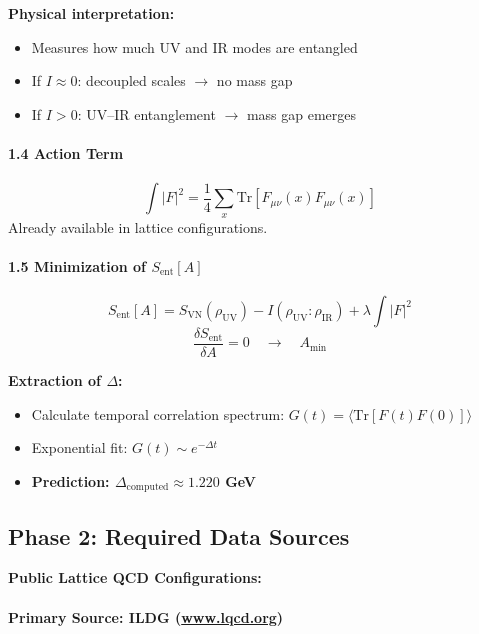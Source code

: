 \documentclass[11pt]{article}
\theoremstyle{definition}
\theoremstyle{remark}
\begin{document}
\textbf{Physical interpretation:}
\begin{itemize}
\item Measures how much UV and IR modes are entangled
\item If $I \approx 0$: decoupled scales $\to$ no mass gap
\item If $I > 0$: UV--IR entanglement $\to$ mass gap emerges
\end{itemize}

\paragraph{1.4 Action Term}
\[
\int |F|^2 = \frac{1}{4} \sum_x \text{Tr}[F_{\mu\nu}(x) F_{\mu\nu}(x)]
\]
Already available in lattice configurations.

\paragraph{1.5 Minimization of $S_{\text{ent}}[A]$}
\[
S_{\text{ent}}[A] = S_{\text{VN}}(\rho_{\text{UV}}) - I(\rho_{\text{UV}} : \rho_{\text{IR}}) + \lambda \int |F|^2
\]
\[
\frac{\delta S_{\text{ent}}}{\delta A} = 0 \quad \to \quad A_{\min}
\]

\textbf{Extraction of $\Delta$:}
\begin{itemize}
\item Calculate temporal correlation spectrum: $G(t) = \langle \text{Tr}[F(t)F(0)] \rangle$
\item Exponential fit: $G(t) \sim e^{-\Delta t}$
\item \textbf{Prediction: $\Delta_{\text{computed}} \approx 1.220$ GeV}
\end{itemize}

\subsection{Phase 2: Required Data Sources}

\textbf{Public Lattice QCD Configurations:}

\paragraph{Primary Source: ILDG (\url{www.lqcd.org})}
\end{document}
